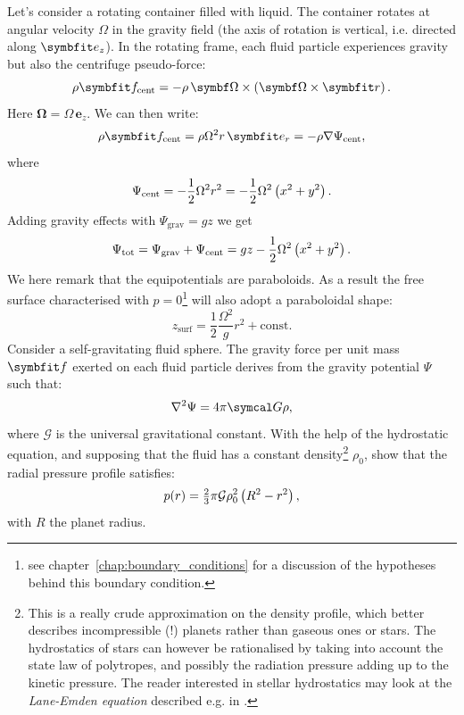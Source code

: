  Let's consider a rotating container filled with liquid. The container rotates at angular velocity $\Omega$ in the gravity field (the axis of rotation is vertical, i.e. directed along  $\be_{z}$). In the rotating frame, each fluid particle experiences gravity but also the centrifuge pseudo-force:
\begin{equation}
\rho\bff_\text{cent} = -\rho \,\symbf \Omega \times \lp \symbf  \Omega \times \br\rp.
\end{equation}
Here $\symbf \Omega = \Omega \,\symbf e_{z}$. We can then write:
\begin{equation}
\rho\bff_\text{cent} = \rho \Omega^2 r \,\be_{r} = -\rho \nabla \Psi_\text{cent},
\end{equation}
where
\begin{equation}
\Psi_\text{cent} = -\frac{1}{2} \Omega^2 r^2 = -\frac{1}{2} \Omega^2 \left( x^2 + y^2\right).
\end{equation}
Adding gravity effects with $\Psi_\text{grav} = gz$ we get 
\begin{equation}
\Psi_\text{tot} = \Psi_\text{grav} + \Psi_\text{cent}  = gz -\frac{1}{2} \Omega^2 \left( x^2 + y^2\right).
\end{equation} 
We here remark that the equipotentials are paraboloids. As a result the free surface characterised with $p = 0$\footnote{see chapter~\ref{chap:boundary_conditions} for a discussion of the hypotheses behind this boundary condition.} will also adopt a paraboloidal shape:
\begin{equation}
z_\text{surf} = \frac{1}{2} \frac{\Omega^2}{g} r^2 + \text{const}.
\end{equation}
 Consider a self-gravitating fluid sphere. The gravity force per unit mass $\bff$ exerted on each fluid particle derives from the gravity potential $\Psi$ such that:
\begin{equation}
\nabla^2 \Psi = 4 \mathrm \pi \symcal G \rho,
\end{equation}
where $\mathcal G$ is the universal gravitational constant. With the help of the hydrostatic equation, and supposing that the fluid has a constant density\footnote{This is a really crude approximation on the density profile, which better describes incompressible (!) planets rather than gaseous ones or stars. The hydrostatics of stars can however be rationalised by taking into account the state law of polytropes, and possibly the radiation pressure adding up to the kinetic pressure. The reader interested in stellar hydrostatics may look at the \textit{Lane-Emden equation} described e.g. in \citet[][chap. IV]{Chandrasekhar1957}.} $\rho_0$, show that the radial pressure profile satisfies:
\begin{equation}
p(r) = \tfrac{2}{3} \mathrm \pi \mathcal G \rho_0^2 \left( R^2 - r^2\right),
\end{equation}
with $R$ the planet radius.

